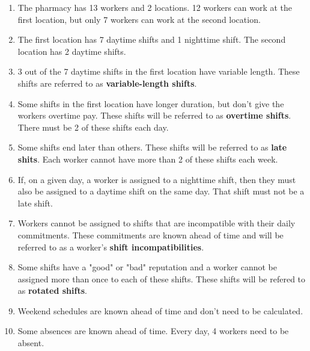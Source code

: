 \documentclass[conference]{IEEEtran}
\begin{document}
\begin{enumerate}[start]
    \item {
        \label{constraint:domain}
        The pharmacy has 13 workers and 2 locations. 12 workers can work at the first location, but only 7 workers can work at the second location.
    }
    \item {
        \label{constraint:shifts}
        The first location has 7 daytime shifts and 1 nighttime shift. The second location has 2 daytime shifts.
    }
    \item {
        \label{constraint:variable-length-shifts}
        3 out of the 7 daytime shifts in the first location have variable length. These shifts are referred to as \textbf{variable-length shifts}.
    }
    \item {
        \label{constraint:overtime-shifts}
        Some shifts in the first location have longer duration, but don't give the workers overtime pay. These shifts will be referred to as \textbf{overtime shifts}. There must be 2 of these shifts each day.
    }
    \item {
        \label{constraint:late-shifts}
        Some shifts end later than others. These shifts will be referred to as \textbf{late shits}. Each worker cannot have more than 2 of these shifts each week.
    }
    \item {
        \label{constraint:nighttime-shift-implies-daytime-shift}
        If, on a given day, a worker is assigned to a nighttime shift, then they must also be assigned to a daytime shift on the same day. That shift must not be a late shift.
    }
    \item {
        \label{constraint:shift-incompatibilities}
        Workers cannot be assigned to shifts that are incompatible with their daily commitments. These commitments are known ahead of time and will be referred to as a worker's \textbf{shift incompatibilities}.
    }
    \item {
        \label{constraint:rotated-shifts}
        Some shifts have a "good" or "bad" reputation and a worker cannot be assigned more than once to each of these shifts. These shifts will be refered to as \textbf{rotated shifts}.
    }
    \item {
        \label{constraint:weekend-schedules-known-ahead-of-time}
        Weekend schedules are known ahead of time and don't need to be calculated.
    }
    \item {
        \label{constraint:absences-known-ahead-of-time}
        Some absences are known ahead of time. Every day, 4 workers need to be absent.
    }
\end{enumerate}
\end{document}
